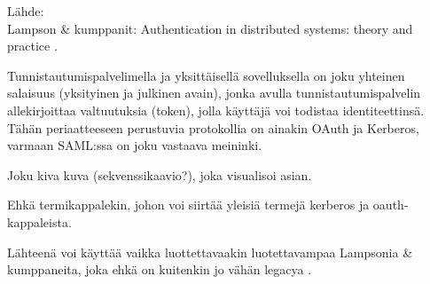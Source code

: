 Lähde:\\
Lampson \& kumppanit: Authentication in distributed systems: theory and practice \cite{lampson}.

Tunnistautumispalvelimella ja yksittäisellä sovelluksella on joku yhteinen salaisuus (yksityinen ja julkinen avain), jonka avulla tunnistautumispalvelin allekirjoittaa valtuutuksia (token), jolla käyttäjä voi todistaa identiteettinsä. Tähän periaatteeseen perustuvia protokollia on ainakin OAuth ja Kerberos, varmaan SAML:ssa on joku vastaava meininki.

Joku kiva kuva (sekvenssikaavio?), joka visualisoi asian.

Ehkä termikappalekin, johon voi siirtää yleisiä termejä kerberos ja oauth-kappaleista.

Lähteenä voi käyttää vaikka luottettavaakin luotettavampaa Lampsonia \& kumppaneita, joka ehkä on kuitenkin jo vähän legacya \cite{lampson}.
